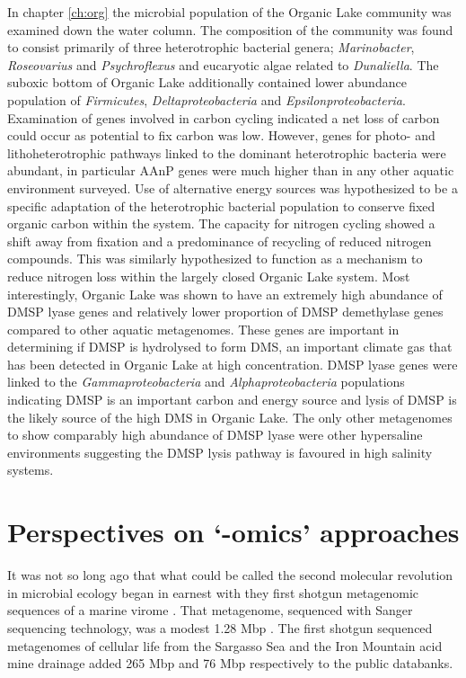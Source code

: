 In chapter \ref{ch:org} the microbial population of the Organic Lake community was examined down the water column.
The composition of the community was found to consist primarily of three heterotrophic bacterial genera; \emph{Marinobacter}, \emph{Roseovarius} and \emph{Psychroflexus} and eucaryotic algae related to \emph{Dunaliella}.
The suboxic bottom of Organic Lake additionally contained lower abundance population of \emph{Firmicutes}, \emph{Deltaproteobacteria} and \emph{Epsilonproteobacteria}.
Examination of genes involved in carbon cycling indicated a net loss of carbon could occur as potential to fix carbon was low.
However, genes for photo- and lithoheterotrophic pathways linked to the dominant heterotrophic bacteria were abundant, in particular \ac{AAnP} genes were much higher than in any other aquatic environment surveyed.
Use of alternative energy sources was hypothesized to be a specific adaptation of the heterotrophic bacterial population to conserve fixed organic carbon within the system.
The capacity for nitrogen cycling showed a shift away from fixation and a predominance of recycling of reduced nitrogen compounds.
This was similarly hypothesized to function as a mechanism to reduce nitrogen loss within the largely closed Organic Lake system.
Most interestingly, Organic Lake was shown to have an extremely high abundance of \ac{DMSP} lyase genes and relatively lower proportion of \ac{DMSP} demethylase genes compared to other aquatic metagenomes.
These genes are important in determining if \ac{DMSP} is hydrolysed to form \ac{DMS}, an important climate gas that has been detected in Organic Lake at high concentration.
\ac{DMSP} lyase genes were linked to the \emph{Gammaproteobacteria} and \emph{Alphaproteobacteria} populations indicating \ac{DMSP} is an important carbon and energy source and lysis of \ac{DMSP} is the likely source of the high \ac{DMS} in Organic Lake.
The only other metagenomes to show comparably high abundance of \ac{DMSP} lyase were other hypersaline environments suggesting the DMSP lysis pathway is favoured in high salinity systems. 



\section{Perspectives on `-omics' approaches }
It was not so long ago that what could be called the second molecular revolution in microbial ecology began in earnest with they first shotgun metagenomic sequences of a marine virome \cite{Breitbart2002}.
That metagenome, sequenced with Sanger sequencing technology, was a modest 1.28 Mbp \cite{Breitbart2002}.
The first shotgun sequenced metagenomes of cellular life from the Sargasso Sea \cite{Venter2004} and the Iron Mountain acid mine drainage \cite{Tyson2004} added 265 Mbp and 76 Mbp respectively to the public databanks.

